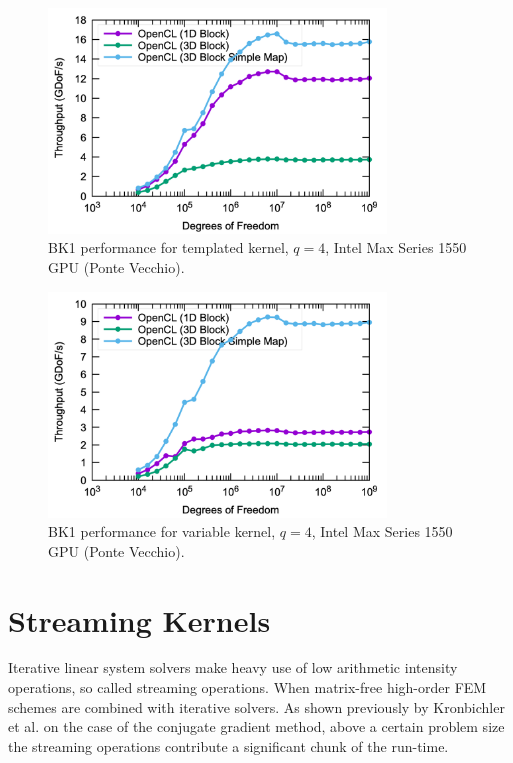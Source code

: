 \documentclass[a4paper,12pt]{article}
\begin{document}
\begin{figure}[htbp]
  \centering
  \includegraphics[width=0.8\textwidth]{pvc_opencl_q4_static} %
  \caption{BK1 performance for templated kernel, $q = 4$, Intel Max Series 1550 GPU (Ponte Vecchio).}
  \label{fig:pvc_static}
\end{figure}

\begin{figure}[htbp]
  \centering
  \includegraphics[width=0.8\textwidth]{pvc_opencl_q4_dynamic} %
  \caption{BK1 performance for variable kernel, $q = 4$, Intel Max Series 1550 GPU (Ponte Vecchio).}
  \label{fig:pvc_dynamic}
\end{figure}

\section{Streaming Kernels}

Iterative linear system solvers make heavy use of low arithmetic intensity operations, so called streaming operations.
When matrix-free high-order FEM schemes are combined with iterative solvers. 
As shown previously by Kronbichler et al. \cite{kronbichler2023} on the case of the conjugate gradient method, above a certain problem size the streaming operations contribute a significant chunk of the run-time.
\end{document}
